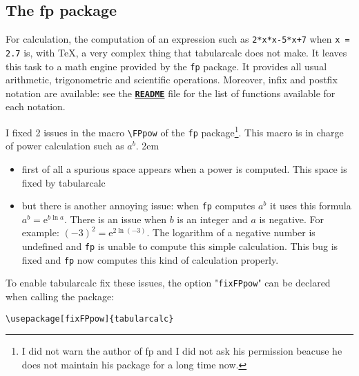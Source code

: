 \documentclass[a4paper,10pt]{article}
\newcommand\tbcalc{\textsf{tabularcalc}\xspace}
\newcommand\mywidth{0.85\linewidth}
\begin{document}
\subsection{The {\ttfamily fp} package}
For calculation, the computation of an expression such as \verb|2*x*x-5*x+7| when \hbox{\verb|x = 2.7|} is, with \TeX{}, a very complex thing that \tbcalc does not make. It leaves this task to a math engine provided by the \verb=fp= package. It provides all usual arithmetic, trigonometric and scientific operations. Moreover, infix and postfix notation are available: see the \href{http://www.ctan.org/get/macros/latex/contrib/fp/README}{\texttt{\textbf{README}}} file for the list of functions available for each notation.\medskip

I fixed 2 issues in the macro \verb=\FPpow= of the \verb=fp= package\footnote{I did not warn the author of {\ttfamily fp} and I did not ask his permission beacuse he does not maintain his package for a long time now.}. This macro is in charge of power calculation such as $a^b$.
\parindent2em
\begin{itemize}
	\item first of all a spurious space appears when a power is computed. This space is fixed by \tbcalc
	\item but there is another annoying issue: when \verb=fp= computes $a^b$ it uses this formula $a^b=\mathrm{e}^{b\ln a}$. There is an issue when $b$ is an integer and $a$ is negative. For example: $(-3)^2=\mathrm{e}^{2\ln(-3)}$. The logarithm of a negative number is undefined and \verb=fp= is unable to compute this simple calculation. This bug is fixed and \verb=fp= now computes this kind of calculation properly.
\end{itemize}\smallskip\parindent0pt

To enable \tbcalc fix these issues, the option "\verb=fixFPpow=" can be declared when calling the package:
\begin{center}
\begin{minipage}{\mywidth}
\begin{lstlisting}
\usepackage[fixFPpow]{tabularcalc}
\end{lstlisting}
\end{minipage}
\end{center}
\end{document}
